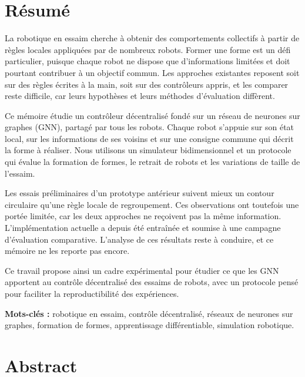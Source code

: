 \cleardoublepage
{}
{}
\listoffigures

\cleardoublepage
{}
{}
\listoftables

\chapter*{Résumé}

La robotique en essaim cherche à obtenir des comportements collectifs
à partir de règles locales appliquées par de nombreux robots. Former une
forme est un défi particulier, puisque chaque robot ne dispose que
d'informations limitées et doit pourtant contribuer à un objectif commun.
Les approches existantes reposent soit sur des règles écrites à la main,
soit sur des contrôleurs appris, et les comparer reste difficile, car
leurs hypothèses et leurs méthodes d'évaluation diffèrent.

Ce mémoire étudie un contrôleur décentralisé fondé sur un réseau de
neurones sur graphes (GNN), partagé par tous les robots. Chaque robot
s'appuie sur son état local, sur les informations de ses voisins et sur
une consigne commune qui décrit la forme à réaliser. Nous utilisons un
simulateur bidimensionnel et un protocole qui évalue la formation de
formes, le retrait de robots et les variations de taille de l'essaim.

Les essais préliminaires d'un prototype antérieur suivent mieux un
contour circulaire qu'une règle locale de regroupement. Ces observations
ont toutefois une portée limitée, car les deux approches ne reçoivent pas
la même information. L'implémentation actuelle a depuis été entraînée et
soumise à une campagne d'évaluation comparative. L'analyse de ces
résultats reste à conduire, et ce mémoire ne les reporte pas encore.

Ce travail propose ainsi un cadre expérimental pour étudier ce que les
GNN apportent au contrôle décentralisé des essaims de robots, avec un
protocole pensé pour faciliter la reproductibilité des expériences.

\noindent\textbf{Mots-clés :} robotique en essaim, contrôle décentralisé,
réseaux de neurones sur graphes, formation de formes, apprentissage
différentiable, simulation robotique.

\chapter*{Abstract}

